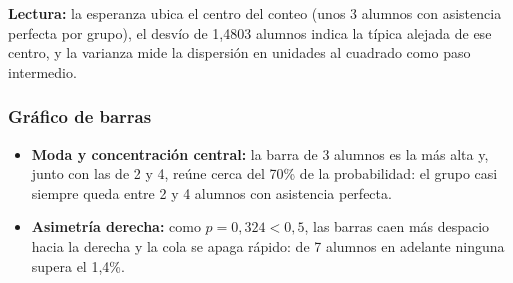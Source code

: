 \medskip
\noindent\textbf{Lectura:} la esperanza ubica el centro del conteo (unos 3 alumnos con asistencia perfecta por grupo), el desvío de 1,4803 alumnos indica la típica alejada de ese centro, y la varianza mide la dispersión en unidades al cuadrado como paso intermedio.

\subsubsection{Gráfico de barras}


\begin{itemize}
  \item \textbf{Moda y concentración central:} la barra de 3 alumnos es la más alta y, junto con
    las de 2 y 4, reúne cerca del 70\% de la probabilidad: el grupo casi siempre queda entre 2 y 4
    alumnos con asistencia perfecta.

  \item \textbf{Asimetría derecha:} como $p = 0{,}324 < 0{,}5$, las barras caen más despacio hacia
    la derecha y la cola se apaga rápido: de 7 alumnos en adelante ninguna supera el 1,4\%.
\end{itemize}